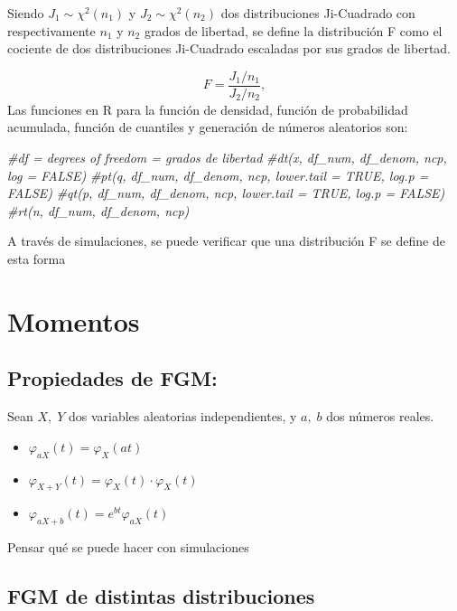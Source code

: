 \documentclass[]{article}
\newenvironment{Shaded}{\begin{snugshade}}{\end{snugshade}}
\newcommand{\CommentTok}[1]{\textcolor[rgb]{0.56,0.35,0.01}{\textit{#1}}}
\begin{document}
Siendo \(J_1 \sim \chi^2(n_1)\) y \(J_2 \sim \chi^2(n_2)\) dos
distribuciones Ji-Cuadrado con respectivamente \(n_1\) y \(n_2\) grados
de libertad, se define la distribución F como el cociente de dos
distribuciones Ji-Cuadrado escaladas por sus grados de libertad.

\[F = \frac{J_1 / n_1}{J_2 / n_2},\] Las funciones en R para la función
de densidad, función de probabilidad acumulada, función de cuantiles y
generación de números aleatorios son:

\begin{Shaded}
\begin{Highlighting}[]
\CommentTok{#df = degrees of freedom = grados de libertad}
\CommentTok{#dt(x, df_num, df_denom, ncp, log = FALSE)}
\CommentTok{#pt(q, df_num, df_denom, ncp, lower.tail = TRUE, log.p = FALSE)}
\CommentTok{#qt(p, df_num, df_denom, ncp, lower.tail = TRUE, log.p = FALSE)}
\CommentTok{#rt(n, df_num, df_denom, ncp)}
\end{Highlighting}
\end{Shaded}

A través de simulaciones, se puede verificar que una distribución F se
define de esta forma

\hypertarget{momentos}{%
\section{Momentos}\label{momentos}}

\hypertarget{propiedades-de-fgm}{%
\subsection{Propiedades de FGM:}\label{propiedades-de-fgm}}

Sean \(X,\;Y\) dos variables aleatorias independientes, y \(a,\;b\) dos
números reales.

\begin{itemize}
\item
  \(\varphi_{aX} (t) = \varphi_X (at)\)
\item
  \(\varphi_{X+Y} (t) = \varphi_X (t) \cdot \varphi_X (t)\)
\item
  \(\varphi_{aX+b} (t) = e^{bt} \varphi_{aX} (t)\)
\end{itemize}

Pensar qué se puede hacer con simulaciones

\hypertarget{fgm-de-distintas-distribuciones}{%
\subsection{FGM de distintas
distribuciones}\label{fgm-de-distintas-distribuciones}}
\end{document}

